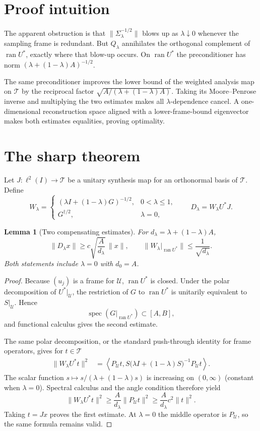 \documentclass[11pt]{article}
\newtheorem{lemma}{Lemma}
\newcommand{\Tt}{\mathcal T}
\newcommand{\Uu}{\mathcal U}
\DeclareMathOperator{\ran}{ran}
\DeclareMathOperator{\spec}{spec}
\begin{document}
\section{Proof intuition}

The apparent obstruction is that $\|\Sigma_\lambda^{-1/2}\|$ blows up as
$\lambda\downarrow0$ whenever the sampling frame is redundant.  But
$Q_\lambda$ annihilates the orthogonal complement of $\ran U^*$, exactly
where that blow-up occurs.  On $\ran U^*$ the preconditioner has norm
$(\lambda+(1-\lambda)A)^{-1/2}$.

The same preconditioner improves the lower bound of the weighted analysis
map on $\Tt$ by the reciprocal factor
$\sqrt{A/(\lambda+(1-\lambda)A)}$.  Taking its Moore--Penrose inverse and
multiplying the two estimates makes all $\lambda$-dependence cancel.  A
one-dimensional reconstruction space aligned with a lower-frame-bound
eigenvector makes both estimates equalities, proving optimality.

\section{The sharp theorem}

Let $J:\ell^2(I)\to\Tt$ be a unitary synthesis map for an orthonormal basis
of $\Tt$.  Define
\[
 W_\lambda=
 \begin{cases}
  (\lambda I+(1-\lambda)G)^{-1/2},&0<\lambda\le1,\\
  G^{\dagger/2},&\lambda=0,
 \end{cases}
 \qquad D_\lambda=W_\lambda U^*J.
\]

\begin{lemma}[Two compensating estimates]\label{lem:compensate}
For $d_\lambda=\lambda+(1-\lambda)A$,
\[
 \|D_\lambda x\|\ge
 c\sqrt{\frac{A}{d_\lambda}}\,\|x\|,
 \qquad
 \|W_\lambda|_{\ran U^*}\|\le\frac1{\sqrt{d_\lambda}}.
\]
Both statements include $\lambda=0$ with $d_0=A$.
\end{lemma}

\begin{proof}
Because $(u_j)$ is a frame for $\Uu$, $\ran U^*$ is closed.  Under the polar
decomposition of $U^*|_{\Uu}$, the restriction of $G$ to $\ran U^*$ is
unitarily equivalent to $S|_{\Uu}$.  Hence
\[
 \spec(G|_{\ran U^*})\subset[A,B],
\]
and functional calculus gives the second estimate.

The same polar decomposition, or the standard push-through identity for
frame operators, gives for $t\in\Tt$
\begin{align*}
 \|W_\lambda U^*t\|^2
 &=\left\langle P_{\Uu}t,
 S\bigl(\lambda I+(1-\lambda)S\bigr)^{-1}P_{\Uu}t\right\rangle.
\end{align*}
The scalar function $s\mapsto s/(\lambda+(1-\lambda)s)$ is increasing on
$(0,\infty)$ (constant when $\lambda=0$).  Spectral calculus and the angle
condition therefore yield
\[
 \|W_\lambda U^*t\|^2
 \ge \frac{A}{d_\lambda}\|P_{\Uu}t\|^2
 \ge \frac{A}{d_\lambda}c^2\|t\|^2.
\]
Taking $t=Jx$ proves the first estimate.  At $\lambda=0$ the middle operator
is $P_{\Uu}$, so the same formula remains valid.
\end{proof}
\end{document}

